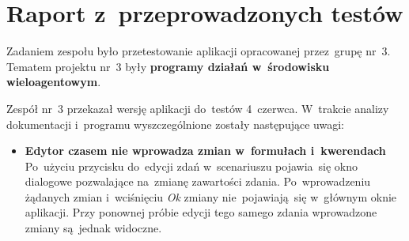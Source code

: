 \documentclass[11pt,a4paper]{article}
\begin{document}
\section{Raport z~przeprowadzonych testów}
\label{sec:our-tests-report}

Zadaniem zespołu było przetestowanie aplikacji opracowanej przez~grupę nr~3.
Tematem projektu nr~3 były \textbf{programy działań w~środowisku wieloagentowym}.

Zespół nr~3 przekazał wersję aplikacji do~testów 4~czerwca.
W~trakcie analizy dokumentacji i~programu wyszczególnione zostały następujące uwagi:

\begin{itemize}
    \item \textbf{Edytor czasem nie wprowadza zmian w~formułach i~kwerendach} \\
    Po~użyciu przycisku do~edycji zdań w~scenariuszu pojawia~się okno dialogowe pozwalające na~zmianę zawartości zdania.
    Po~wprowadzeniu żądanych zmian i~wciśnięciu \emph{Ok} zmiany nie~pojawiają~się w~głównym oknie aplikacji.
    Przy ponownej próbie edycji tego samego zdania wprowadzone zmiany są~jednak widoczne.


\end{itemize}
\end{document}
